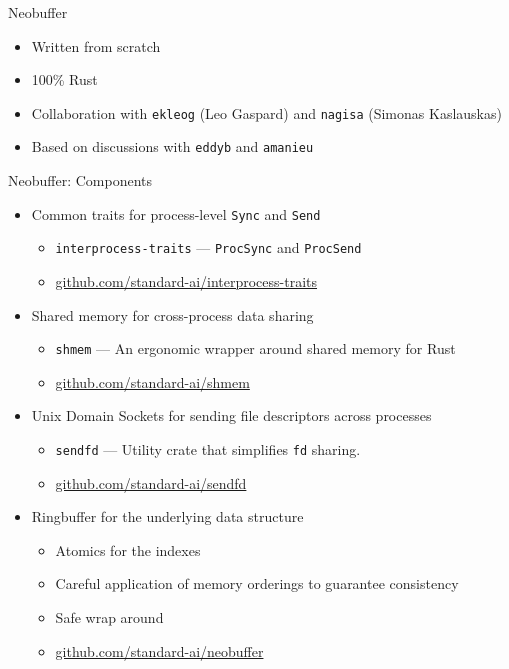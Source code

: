 \documentclass[aspectratio=43]{beamer}
\begin{document}
\begin{frame}{Neobuffer}
    \begin{itemize}
        \item Written from scratch
        \item 100\% Rust
        \item Collaboration with \texttt{ekleog} (Leo Gaspard) and
            \texttt{nagisa} (Simonas Kaslauskas)
        \item Based on discussions with \texttt{eddyb} and \texttt{amanieu}
    \end{itemize}
\end{frame}

\begin{frame}{Neobuffer: Components}
    \begin{itemize}
        \item<1-> Common traits for process-level \texttt{Sync} and
            \texttt{Send}
            \begin{itemize}
                \item \texttt{interprocess-traits} --- \texttt{ProcSync} and
                    \texttt{ProcSend}
                \item \url{github.com/standard-ai/interprocess-traits}
            \end{itemize}
        \item<2-> Shared memory for cross-process data sharing
            \begin{itemize}
                \item \texttt{shmem} --- An ergonomic wrapper around shared
                    memory for Rust
                \item \url{github.com/standard-ai/shmem}
            \end{itemize}
        \item<3-> Unix Domain Sockets for sending file descriptors across
            processes
            \begin{itemize}
                \item \texttt{sendfd} --- Utility crate that simplifies
                    \texttt{fd} sharing.
                \item \url{github.com/standard-ai/sendfd}
            \end{itemize}
        \item<4-> Ringbuffer for the underlying data structure
            \begin{itemize}
                \item Atomics for the indexes
                \item Careful application of memory orderings to guarantee
                    consistency
                \item Safe wrap around
                \item \url{github.com/standard-ai/neobuffer}
            \end{itemize}
    \end{itemize}
\end{frame}
\end{document}
